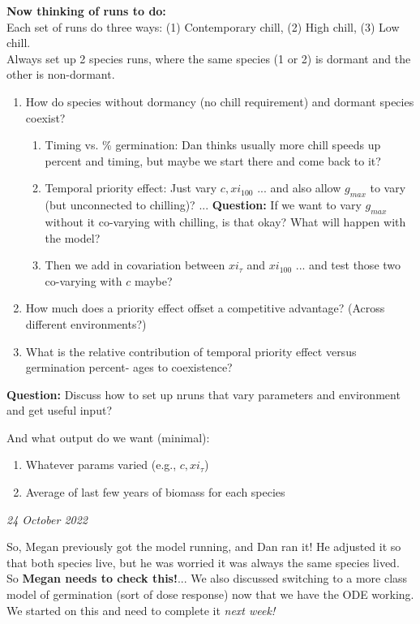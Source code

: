\documentclass[11pt,letter]{article}
\begin{document}
{\bf Now thinking of runs to do:}\\

Each set of runs do three ways: (1) Contemporary chill, (2) High chill, (3) Low chill. \\

Always set up 2 species runs, where the same species (1 or 2) is dormant and the other is non-dormant. 

\begin{enumerate}
\item How do species without dormancy (no chill requirement) and dormant species coexist? 
\begin{enumerate}
\item Timing vs. \% germination: Dan thinks usually more chill speeds up percent and timing, but maybe we start there and come back to it? 
\item Temporal priority effect: Just vary $c, xi_{100}$ ... and also allow $g_{max}$ to vary (but unconnected to chilling)? ... {\bf Question:} If we want to vary $g_{max}$ without it co-varying with chilling, is that okay? What will happen with the model? 
\item Then we add in covariation between $xi_{\tau}$ and $xi_{100}$ ... and test those two co-varying with $c$ maybe? 
\end{enumerate}
\item How much does a priority effect offset a competitive advantage? (Across different environments?) 
\item What is the relative contribution of temporal priority effect versus germination percent- ages to coexistence?
\end{enumerate}


{\bf Question:} Discuss how to set up nruns that vary parameters and environment and get useful input?  

And what output do we want (minimal):
\begin{enumerate}
\item Whatever params varied (e.g., $c, xi_{\tau}$)
\item Average of last few years of biomass for each species
\end{enumerate}


\emph{24 October 2022}

So, Megan previously got the model running, and Dan ran it! He adjusted it so that both species live, but he was worried it was always the same species lived. So {\bf Megan needs to check this!}... We also discussed switching to a more class model of germination (sort of dose response) now that we have the ODE working. We started on this and need to complete it \emph{next week!}\\
\end{document}
